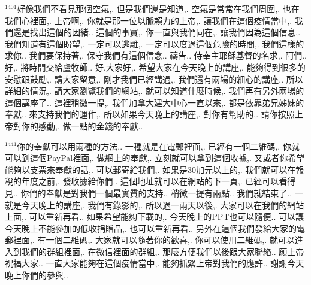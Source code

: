 \documentclass{book}
\begin{document}
$^{1401}$好像我們不看見那個空氣,.
但是我們還是知道,.
空氣是常常在我們周圍,.
也在我們心裡面,.
上帝啊,.
你就是那一位以脈賴力的上帝,.
讓我們在這個疫情當中,.
我們還是找出這個的因緒,.
這個的事實,.
你一直與我們同在,.
讓我們因為這個信息,.
我們知道有這個盼望,.
一定可以逃離,.
一定可以度過這個危險的時間,.
我們這樣的求你,.
我們要保持著,.
保守我們有這個信念,.
禱告,.
侍奉主耶穌基督的名求,.
阿們..
好,.
將時間交給盧牧師..
好,大家好,.
希望大家在今天晚上的講座,.
能夠得到很多的安慰跟鼓勵,.
請大家留意,.
剛才我們已經講過,.
我們還有兩場的細心的講座,.
所以詳細的情況,.
請大家瀏覽我們的網站,.
就可以知道什麼時候,.
我們再有另外兩場的這個講座了..
這裡稍微一提,.
我們加拿大建大中心一直以來,.
都是依靠弟兄姊妹的奉獻,.
來支持我們的運作,.
所以如果今天晚上的講座,.
對你有幫助的,.
請你按照上帝對你的感動,.
做一點的金錢的奉獻..

$^{1441}$你的奉獻可以用兩種的方法,.
一種就是在電郵裡面,.
已經有一個二維碼,.
你就可以到這個PayPal裡面,.
做網上的奉獻,.
立刻就可以拿到這個收據,.
又或者你希望能夠以支票來奉獻的話,.
可以郵寄給我們,.
如果是30加元以上的,.
我們就可以在報稅的年度之前,.
發收據給你們..
這個地址就可以在網站的下一頁,.
已經可以看得見..
你們的奉獻是對我們一個最實質的支持..
稍微一提有兩點,.
我們就結束了..
一就是今天晚上的講座,.
我們有錄影的,.
所以過一兩天以後,.
大家可以在我們的網站上面,.
可以重新再看..
如果希望能夠下載的,.
今天晚上的PPT也可以隨便..
可以讓今天晚上不能參加的低收捐贈品,.
也可以重新再看..
另外在這個我們發給大家的電郵裡面,.
有一個二維碼,.
大家就可以隨著你的歡喜,.
你可以使用二維碼,.
就可以進入到我們的群組裡面,.
在微信裡面的群組,.
那麼方便我們以後跟大家聯絡..
願上帝祝福大家,.
一直大家能夠在這個疫情當中,.
能夠抓緊上帝對我們的應許..
謝謝今天晚上你們的參與..
\newpage
\end{document}
